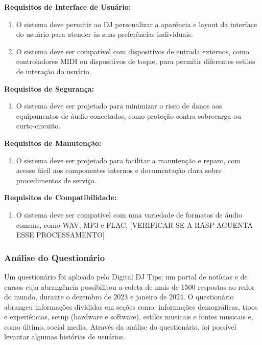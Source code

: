 \textbf{Requisitos de Interface de Usuário:}
\begin{enumerate}[label=\textbullet]
\item O sistema deve permitir ao DJ personalizar a aparência e layout da interface do usuário para atender às suas preferências individuais.
\item O sistema deve ser compatível com dispositivos de entrada externos, como controladores MIDI ou dispositivos de toque, para permitir diferentes estilos de interação do usuário.
\end{enumerate}

\textbf{Requisitos de Segurança:}
\begin{enumerate}[label=\textbullet]
\item O sistema deve ser projetado para minimizar o risco de danos aos equipamentos de áudio conectados, como proteção contra sobrecarga ou curto-circuito.
\end{enumerate}

\textbf{Requisitos de Manutenção:}
\begin{enumerate}[label=\textbullet]
\item O sistema deve ser projetado para facilitar a manutenção e reparo, com acesso fácil aos componentes internos e documentação clara sobre procedimentos de serviço.
\end{enumerate}

\textbf{Requisitos de Compatibilidade:}
\begin{enumerate}[label=\textbullet]
\item O sistema deve ser compatível com uma variedade de formatos de áudio comuns, como WAV, MP3 e FLAC. [VERIFICAR SE A RASP AGUENTA ESSE PROCESSAMENTO] 
\end{enumerate}

\subsubsection{Análise do Questionário}

Um questionário foi aplicado pelo Digital DJ Tips; um portal de notícias e de cursos cuja abrangência possibilitou a coleta de mais de 1500 respostas ao redor do mundo, durante o dezembro de 2023 e janeiro de 2024. O questionário abrangeu informações divididas em seções como: informações demográficas, tipos e experiências, setup (hardware e software), estilos musicais e fontes musicais e, como último, social media. Através da análise do questionário, foi possível levantar algumas histórias de usuários. 

